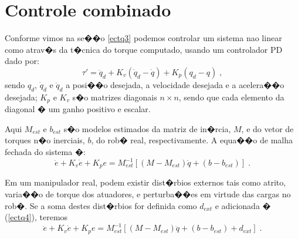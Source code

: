 \section{Controle combinado}
Conforme vimos na se��o \ref{ectq3} podemos controlar um sistema nao linear como  atrav�s da t�cnica do torque computado, usando um controlador PD dado por:
\begin{equation} \label{ectq3}
\tau'=\ddot{q}_d+K_v(\dot{q}_d-\dot{q})+K_p(q_d-q) \; ,
\end{equation}
sendo $q_{d}$, $\dot{q}_{d}$ e $\ddot{q}_{d}$ a posi��o desejada, a velocidade desejada e a acelera��o desejada; $K_p$
e $K_v$ s�o matrizes diagonais $n \times n$, sendo que cada elemento da diagonal � um ganho positivo e escalar.

Aqui $M_{est}$ e $b_{est}$ s�o modelos estimados da matriz de in�rcia, $M$, e do vetor de torques n�o inerciais, $b$, do rob� real,  respectivamente. A equa��o de malha fechada do sistema �:
\begin{equation} \label{ectq4}
\ddot{e}+K_v\dot{e}+K_pe=M_{est}^{-1}[(M-M_{est})\ddot{q}+(b-b_{est})] \; .
\end{equation}

Em um manipulador real, podem existir dist�rbios externos tais como atrito, varia��o de torque dos atuadores, e perturba��es em virtude  das cargas no rob�. Se a soma destes dist�rbios for definida como $d_{ext}$ e adicionada � (\ref{ectq4}), teremos
\begin{equation} \label{ectq5}
\ddot{e}+K_v\dot{e}+K_pe=M_{est}^{-1}[(M-M_{est})\ddot{q}+(b-b_{est})+d_{ext}] \; .
\end{equation}
